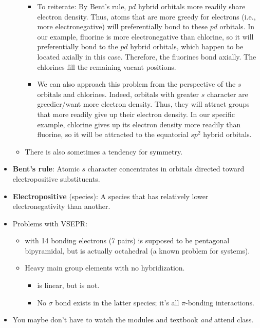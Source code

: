 \documentclass[../notes.tex]{subfiles}
\begin{document}
\begin{itemize}
\begin{itemize}
        \begin{itemize}
            \item To reiterate: By Bent's rule, $pd$ hybrid orbitals more readily share electron density. Thus, atoms that are more greedy for electrons (i.e., more electronegative) will preferentially bond to these $pd$ orbitals. In our example, fluorine is more electronegative than chlorine, so it will preferentially bond to the $pd$ hybrid orbitals, which happen to be located axially in this case. Therefore, the fluorines bond axially. The chlorines fill the remaining vacant positions.
            \item We can also approach this problem from the perspective of the $s$ orbitals and chlorines. Indeed, orbitals with greater $s$ character are greedier/want more electron density. Thus, they will attract groups that more readily give up their electron density. In our specific example, chlorine gives up its electron density more readily than fluorine, so it will be attracted to the equatorial $sp^2$ hybrid orbitals.
        \end{itemize}
        \item There is also sometimes a tendency for symmetry.
    \end{itemize}
    \item \textbf{Bent's rule}: Atomic $s$ character concentrates in orbitals directed toward electropositive substituents.
    \item \textbf{Electropositive} (species): A species that has relatively lower electronegativity than another.
    \item Problems with VSEPR:
    \begin{itemize}
        \item {} with 14 bonding electrons (7 pairs) is supposed to be pentagonal bipyramidal, but is actually octahedral (a known problem for  systems).
        \item Heavy main group elements with no hybridization.
        \begin{itemize}
            \item {} is linear, but  is not.
            \item No $\sigma$ bond exists in the latter species; it's all $\pi$-bonding interactions.
        \end{itemize}
    \end{itemize}
    \item You maybe don't have to watch the modules and textbook \emph{and} attend class.
\end{itemize}
\end{document}
